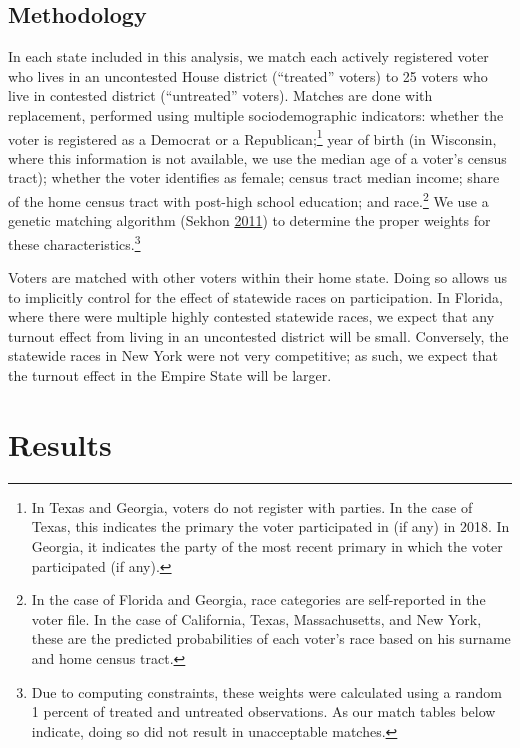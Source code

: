 \documentclass[
  12pt,
]{article}
\begin{document}
\hypertarget{methodology}{%
\subsection*{Methodology}\label{methodology}}

In each state included in this analysis, we match each actively registered voter who lives in an uncontested House district (``treated'' voters) to 25 voters who live in contested district (``untreated'' voters). Matches are done with replacement, performed using multiple sociodemographic indicators: whether the voter is registered as a Democrat or a Republican;\footnote{In Texas and Georgia, voters do not register with parties. In the case of Texas, this indicates the primary the voter participated in (if any) in 2018. In Georgia, it indicates the party of the most recent primary in which the voter participated (if any).} year of birth (in Wisconsin, where this information is not available, we use the median age of a voter's census tract); whether the voter identifies as female; census tract median income; share of the home census tract with post-high school education; and race.\footnote{In the case of Florida and Georgia, race categories are self-reported in the voter file. In the case of California, Texas, Massachusetts, and New York, these are the predicted probabilities of each voter's race based on his surname and home census tract.} We use a genetic matching algorithm (Sekhon \protect\hyperlink{ref-Sekhon2011}{2011}) to determine the proper weights for these characteristics.\footnote{Due to computing constraints, these weights were calculated using a random 1 percent of treated and untreated observations. As our match tables below indicate, doing so did not result in unacceptable matches.}

Voters are matched with other voters within their home state. Doing so allows us to implicitly control for the effect of statewide races on participation. In Florida, where there were multiple highly contested statewide races, we expect that any turnout effect from living in an uncontested district will be small. Conversely, the statewide races in New York were not very competitive; as such, we expect that the turnout effect in the Empire State will be larger.

\hypertarget{results}{%
\section*{Results}\label{results}}
\end{document}
